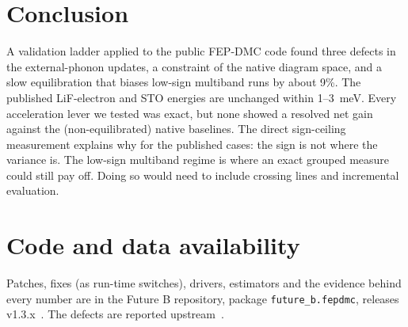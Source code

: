 \documentclass[aps,prb,reprint,superscriptaddress,nofootinbib]{revtex4-2}
\newcommand{\code}[1]{\texttt{#1}}
\begin{document}
\section{Conclusion}

A validation ladder applied to the public FEP-DMC code found three defects in the external-phonon updates, a constraint of the native diagram space, and a slow equilibration that biases low-sign multiband runs by about 9\%. The published LiF-electron and STO energies are unchanged within 1--3~meV. Every acceleration lever we tested was exact, but none showed a resolved net gain against the (non-equilibrated) native baselines. The direct sign-ceiling measurement explains why for the published cases: the sign is not where the variance is. The low-sign multiband regime is where an exact grouped measure could still pay off. Doing so would need to include crossing lines and incremental evaluation.

\section*{Code and data availability}
Patches, fixes (as run-time switches), drivers, estimators and the evidence behind every number are in the Future B repository, package \code{future\_b.fepdmc}, releases v1.3.x~\cite{FutureB}. The defects are reported upstream~\cite{UpstreamIssue}.
\end{document}
